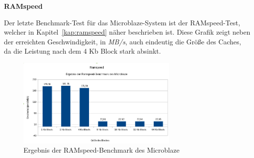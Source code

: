 \textbf{RAMspeed}

Der letzte Benchmark-Test für das Microblaze-System ist der RAMspeed-Test, welcher in Kapitel~\ref{kap:ramspeed} näher beschrieben ist. Diese Grafik zeigt neben der
erreichten Geschwindigkeit, in \emph{MB/s}, auch eindeutig die Größe des Caches, da die Leistung nach dem 4 Kb Block stark absinkt.\\


\begin{figure}[H]
\centering
\includegraphics[width=0.7\textwidth]{Hauptteil/ramspeedmb.png}
\caption{Ergebnis der RAMspeed-Benchmark des Microblaze}
\label{fig:ramspeedmb}
\end{figure}
